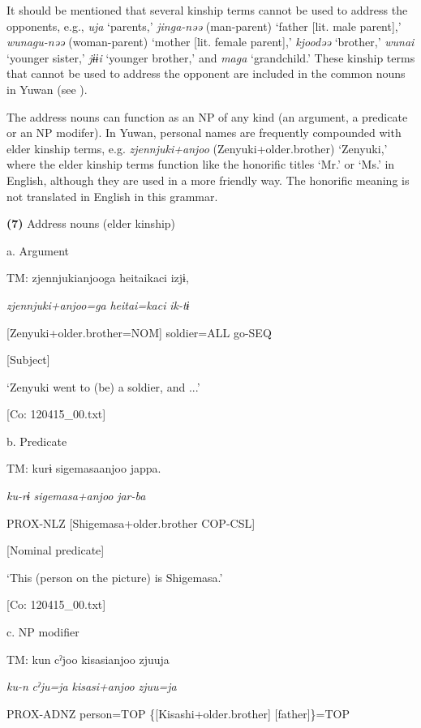 It should be mentioned that several kinship terms cannot be used to address the opponents, e.g., \textit{uja} ‘parents,’ \textit{jinga-nəə} (man-parent) ‘father [lit. male parent],’ \textit{wunagu-nəə} (woman-parent) ‘mother [lit. female parent],’ \textit{kjoodəə} ‘brother,’ \textit{wunai} ‘younger sister,’ \textit{jɨɨi} ‘younger brother,’ and \textit{maga} ‘grandchild.’ These kinship terms that cannot be used to address the opponent are included in the common nouns in Yuwan (see ).

The address nouns can function as an NP of any kind (an argument, a predicate or an NP modifer). In Yuwan, personal names are frequently compounded with elder kinship terms, e.g. \textit{zjennjuki+anjoo} (Zenyuki+older.brother) ‘Zenyuki,’ where the elder kinship terms function like the honorific titles ‘Mr.’ or ‘Ms.’ in English, although they are used in a more friendly way. The honorific meaning is not translated in English in this grammar.

\textbf{(7)}  Address nouns (elder kinship)

  a.  Argument

    TM:  zjennjukianjooga  {\textbar}heitai{\textbar}kaci  izjɨ,

      \textit{zjennjuki+anjoo=ga}  \textit{heitai=kaci}  \textit{ik-tɨ}

      [Zenyuki+older.brother=NOM]  soldier=ALL  go-SEQ

      [Subject]    

      ‘Zenyuki went to (be) a soldier, and ...’

      [Co: 120415\_00.txt]

  b.  Predicate

    TM:  kurɨ  sigemasaanjoo  jappa.

      \textit{ku-rɨ}  \textit{sigemasa+anjoo}  \textit{jar-ba}

      PROX-NLZ  [Shigemasa+older.brother  COP-CSL]

        [Nominal predicate]  

      ‘This (person on the picture) is Shigemasa.’

      [Co: 120415\_00.txt]

  c.  NP modifier

    TM:  kun  cˀjoo  kisasianjoo  zjuuja

      \textit{ku-n}  \textit{cˀju=ja}  \textit{kisasi+anjoo}  \textit{zjuu=ja}

      PROX-ADNZ  person=TOP  \{[Kisashi+older.brother]  [father]\}=TOP

